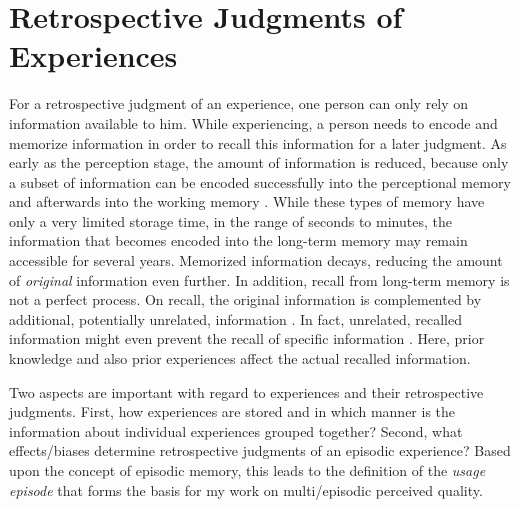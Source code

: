 \section{Retrospective Judgments of Experiences}\label{chap:03}
For a retrospective judgment of an experience, one person can only rely on information available to him.
While experiencing, a person needs to encode and memorize information in order to recall this information for a later judgment.
As early as the perception stage, the amount of information is reduced, because only a subset of information can be encoded successfully into the perceptional memory and afterwards into the working memory \citep[][p.\,8f.]{raake_speech_2006}.
While these types of memory have only a very limited storage time, in the range of seconds to minutes, the information that becomes encoded into the long-term memory may remain accessible for several years.
Memorized information decays, reducing the amount of \emph{original} information even further.
In addition, recall from long-term memory is not a perfect process.
On recall, the original information is complemented by additional, potentially unrelated, information \citep[\cf,][]{schacter_seven_2003}.
In fact, unrelated, recalled information might even prevent the recall of specific information \citep[\cf,][]{schacter_seven_2003}.
Here, prior knowledge and also prior experiences affect the actual recalled information.

Two aspects are important with regard to experiences and their retrospective judgments.
First, how experiences are stored and in which manner is the information about individual experiences grouped together?
Second, what effects/biases determine retrospective judgments of an episodic experience?
Based upon the concept of episodic memory, this leads to the definition of the \emph{usage episode} that forms the basis for my work on multi\-/episodic perceived quality.

